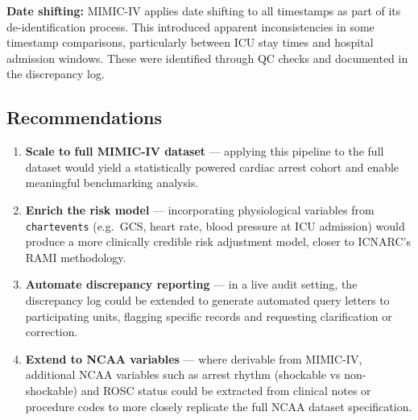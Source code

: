 \documentclass[
]{article}
\begin{document}
\textbf{Date shifting:} MIMIC-IV applies date shifting to all timestamps
as part of its de-identification process. This introduced apparent
inconsistencies in some timestamp comparisons, particularly between ICU
stay times and hospital admission windows. These were identified through
QC checks and documented in the discrepancy log.

\subsection{Recommendations}\label{recommendations}

\begin{enumerate}
\def\labelenumi{\arabic{enumi}.}
\item
  \textbf{Scale to full MIMIC-IV dataset} --- applying this pipeline to
  the full dataset would yield a statistically powered cardiac arrest
  cohort and enable meaningful benchmarking analysis.
\item
  \textbf{Enrich the risk model} --- incorporating physiological
  variables from \texttt{chartevents} (e.g.~GCS, heart rate, blood
  pressure at ICU admission) would produce a more clinically credible
  risk adjustment model, closer to ICNARC's RAMI methodology.
\item
  \textbf{Automate discrepancy reporting} --- in a live audit setting,
  the discrepancy log could be extended to generate automated query
  letters to participating units, flagging specific records and
  requesting clarification or correction.
\item
  \textbf{Extend to NCAA variables} --- where derivable from MIMIC-IV,
  additional NCAA variables such as arrest rhythm (shockable vs
  non-shockable) and ROSC status could be extracted from clinical notes
  or procedure codes to more closely replicate the full NCAA dataset
  specification.
\end{enumerate}
\end{document}
